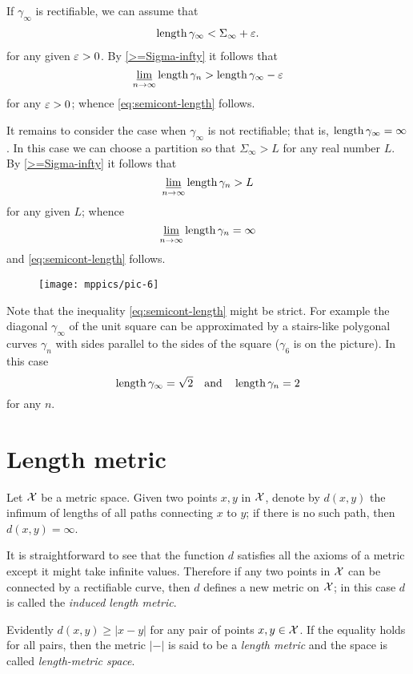 If $\gamma_\infty$ is rectifiable, we can assume that 
\begin{align*}
\mathop{\rm length}\nolimits\gamma_\infty<\Sigma_\infty+\varepsilon.
\end{align*}
for any given $\varepsilon>0$.
By \ref{>=Sigma-infty} it follows that 
$$\varliminf_{n\to\infty} \mathop{\rm length}\nolimits\gamma_n > \mathop{\rm length}\nolimits\gamma_\infty-\varepsilon$$
for any $\varepsilon>0$; whence \ref{eq:semicont-length} follows.

It remains to consider the case when $\gamma_\infty$ is not rectifiable; 
that is, $\mathop{\rm length}\nolimits\gamma_\infty=\infty$.
In this case we can choose a partition so that $\Sigma_\infty>L$ for any real number $L$.
By \ref{>=Sigma-infty} it follows that 
$$\varliminf_{n\to\infty} \mathop{\rm length}\nolimits\gamma_n > L$$
for any given $L$; whence 
\[\varliminf_{n\to\infty}\mathop{\rm length}\nolimits\gamma_n=\infty\]
and \ref{eq:semicont-length} follows.
\qeds


\begin{wrapfigure}{o}{20 mm}
\vskip-0mm
\centering
\texttt{[image: mppics/pic-6]}
\end{wrapfigure}


Note that the inequality \ref{eq:semicont-length} might be strict.
For example the diagonal $\gamma_\infty$ of the unit square 
can be  approximated by a stairs-like
polygonal curves $\gamma_n$
with sides parallel to the sides of the square ($\gamma_6$ is on the picture).
In this case
\[\mathop{\rm length}\nolimits\gamma_\infty=\sqrt{2}\quad
\text{and}\quad \mathop{\rm length}\nolimits\gamma_n=2\]
for any $n$.



\section{Length metric}

Let $\mathcal{X}$ be a metric space.
Given two points $x,y$ in $\mathcal{X}$, denote by $d(x,y)$ the infimum of lengths of all paths connecting $x$ to $y$; if there is no such path, then $d(x,y)=\infty$.

It is straightforward to see that the function $d$ satisfies all the axioms of a metric except it might take infinite values.
Therefore if any two points in $\mathcal{X}$ can be connected by a rectifiable curve, then $d$ defines a new metric on $\mathcal{X}$; in this case $d$ is called the \emph{induced length metric}.

Evidently $d(x,y)\ge |x-y|$ for any pair of points $x,y\in \mathcal{X}$.
If the equality holds for all pairs, then the metric $|-|$ is said to be a \emph{length metric} and the space is called \emph{length-metric space}.

